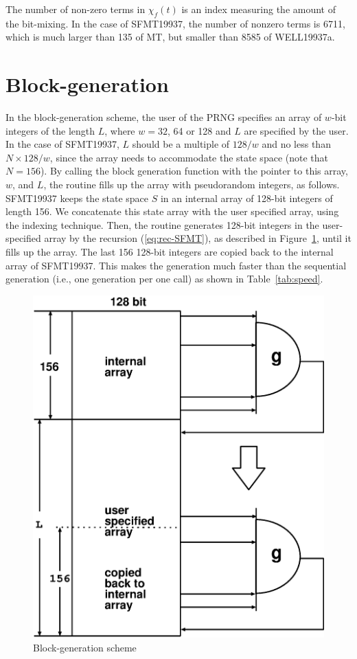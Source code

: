 \documentclass[acmnow]{acmtrans2m}
\begin{document}
\begin{remark}
The number of non-zero terms in $\chi_f(t)$ is 
an index measuring the amount of the bit-mixing. 
In the case of SFMT19937, the number of nonzero 
terms is 6711, which is much larger than 135 of MT, 
but smaller than 8585 of WELL19937a. 
\end{remark}

\section{Block-generation}\label{sec:block}
In the block-generation scheme, 
the user of the PRNG specifies an array
of $w$-bit integers of the length $L$, 
where $w=32$, 64 or 128 and $L$ are specified
by the user.
In the case of SFMT19937,
$L$ should be a multiple of $128/w$
and no less than $N \times 128/w$,
since the array needs to accommodate the state space
(note that $N=156$).
By calling the block generation function 
with the pointer to this array, $w$, and $L$, 
the routine fills up the array with
pseudorandom integers, as follows. SFMT19937 keeps the state
space $S$ in an internal array of 128-bit integers of length 156.
We concatenate this state array with the user specified array, 
using the indexing technique.
Then, the routine generates 128-bit integers in the user-specified 
array by the recursion (\ref{eq:rec-SFMT}), as described
in Figure~\ref{fig:B1}, until it fills up the array.
The last 156 128-bit integers
are copied back to the internal array
of SFMT19937. 
This makes the generation much faster than the sequential generation
(i.e., one generation per one call) as shown in Table~\ref{tab:speed}.
\begin{figure}
\begin{center}
\includegraphics[width=0.7\linewidth,height=0.7\textheight,
keepaspectratio]{fill_array.eps}
\end{center}
\caption{Block-generation scheme}
\label{fig:B1}
\end{figure}



\begin{received}
\end{received}
\end{document}
